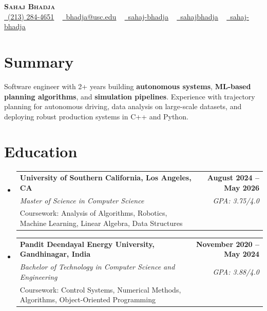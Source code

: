 \documentclass[letterpaper,10pt]{article}
\makeatletter
\newcommand{\resumeEduSubheading}[5]{\vspace{-1pt}\item\begin{tabular*}{1.0\textwidth}[t]{l@{\extracolsep{\fill}}r}\textbf{#1} & \textbf{\small #2} \\\textit{\small #3} & \textit{\small #4} \\\small #5 & \\\end{tabular*}\vspace{-4pt}}
\newcommand{\resumeSubHeadingListStart}{\begin{itemize}[leftmargin=0.0in, label={}]}
\newcommand{\resumeSubHeadingListEnd}{\end{itemize}}
\makeatother
\begin{document}
\begin{center}
{\Huge \scshape \textbf{Sahaj Bhadja}} \\ \vspace{1pt}
\small \href{tel:(213) 284-4651}{\faPhone\ \underline{(213) 284-4651}} ~ \href{mailto:bhadja@usc.edu}{\raisebox{-0.2\height}\faEnvelope\ \underline{bhadja@usc.edu}} ~
\href{https://www.linkedin.com/in/sahaj-bhadja/}{\raisebox{-0.2\height}\faLinkedin\ \underline{sahaj-bhadja}} ~ \href{https://github.com/SAHAJ-BHADJA}{\raisebox{-0.2\height}\faGithub\ \underline{sahajbhadja}} ~
\href{https://sahaj-bhadja.vercel.app/}{\raisebox{-0.2\height}\faGlobe\ \underline{sahaj-bhadja}}
\end{center}
\vspace{-18pt}
\section{Summary}
\begin{itemize}[leftmargin=0.15in, label={}]
\small{\item{Software engineer with 2+ years building \textbf{autonomous systems}, \textbf{ML-based planning algorithms}, and \textbf{simulation pipelines}. Experience with trajectory planning for autonomous driving, data analysis on large-scale datasets, and deploying robust production systems in C++ and Python.}}
\end{itemize}
\vspace{-16pt}
\section{Education}
\resumeSubHeadingListStart
\resumeEduSubheading{University of Southern California, Los Angeles, CA}{August 2024 -- May 2026}{Master of Science in Computer Science}{GPA: 3.75/4.0}{Coursework: Analysis of Algorithms, Robotics, Machine Learning, Linear Algebra, Data Structures}
\vspace{-9pt}
\resumeEduSubheading{Pandit Deendayal Energy University, Gandhinagar, India}{November 2020 -- May 2024}{Bachelor of Technology in Computer Science and Engineering}{GPA: 3.88/4.0}{Coursework: Control Systems, Numerical Methods, Algorithms, Object-Oriented Programming}
\resumeSubHeadingListEnd
\vspace{-14pt}
\end{document}
